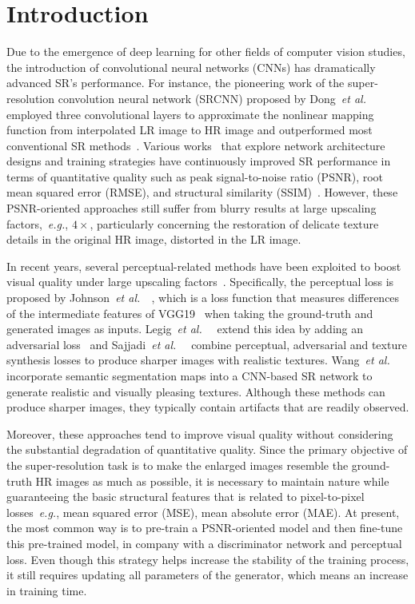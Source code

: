 \documentclass[preprint]{elsarticle}
\newcommand{\etal}{\textit{et al.~}}
\newcommand{\eg}{\textit{e.g.}}
\begin{document}
\section{Introduction}

Due to the emergence of deep learning for other fields of computer vision studies, the introduction of convolutional neural networks (CNNs) has dramatically advanced SR's performance. For instance, the pioneering work of the super-resolution convolution neural network (SRCNN) proposed by Dong~\etal~\cite{SRCNN,SRCNN-Ex} employed three convolutional layers to approximate the nonlinear mapping function from interpolated LR image to HR image and outperformed most conventional SR methods~\cite{PCPE-MDSISR_IS16,Hadamard_IS18}. Various works~\cite{FSRCNN,VDSR,DRCN,ESPCN,DRRN,LapSRN,EDSR,MemNet,SRDenseNet,IDN,RDN,RCAN} that explore network architecture designs and training strategies have continuously improved SR performance in terms of quantitative quality such as peak signal-to-noise ratio (PSNR), root mean squared error (RMSE), and structural similarity (SSIM)~\cite{SSIM}. However, these PSNR-oriented approaches still suffer from blurry results at large upscaling factors,~\eg, $4 \times$, particularly concerning the restoration of delicate texture details in the original HR image, distorted in the LR image.

In recent years, several perceptual-related methods have been exploited to boost visual quality under large upscaling factors~\cite{Perceptual-loss,SRGAN,EnhanceNet,CX,ESRGAN}. Specifically, the perceptual loss is proposed by Johnson~\etal~\cite{Perceptual-loss}, which is a loss function that measures differences of the intermediate features of VGG19~\cite{VGG19} when taking the ground-truth and generated images as inputs. Legig~\etal~\cite{SRGAN} extend this idea by adding an adversarial loss~\cite{GAN} and Sajjadi~\etal~\cite{EnhanceNet} combine perceptual, adversarial and texture synthesis losses to produce sharper images with realistic textures. Wang~\etal~\cite{SFTGAN} incorporate semantic segmentation maps into a CNN-based SR network to generate realistic and visually pleasing textures. Although these methods can produce sharper images, they typically contain artifacts that are readily observed. 

Moreover, these approaches tend to improve visual quality without considering the substantial degradation of quantitative quality. Since the primary objective of the super-resolution task is to make the enlarged images resemble the ground-truth HR images as much as possible, it is necessary to maintain nature while guaranteeing the basic structural features that is related to pixel-to-pixel losses~\eg, mean squared error (MSE), mean absolute error (MAE). At present, the most common way is to pre-train a PSNR-oriented model and then fine-tune this pre-trained model, in company with a discriminator network and perceptual loss. Even though this strategy helps increase the stability of the training process, it still requires updating all parameters of the generator, which means an increase in training time.
\end{document}

